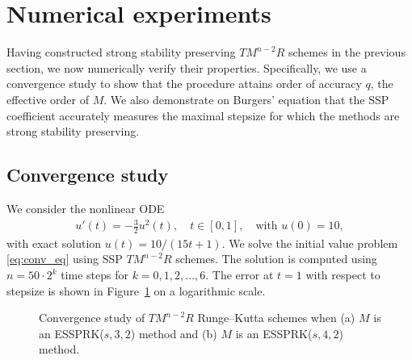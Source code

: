 \section{Numerical experiments}\label{sec:numerics}
Having constructed strong stability preserving $TM^{n-2}R$ schemes in the previous
section, we now numerically verify their properties.
Specifically, we use a convergence study to show that the procedure
attains order of accuracy $q$, the effective order of $M$.
We also demonstrate on Burgers' equation that the
SSP coefficient accurately measures the maximal stepsize for which the
methods are strong stability preserving.

\subsection{Convergence study}\label{subsec:convergence}
We consider the nonlinear ODE
\begin{align}\label{eq:conv_eq}
    u'(t) = -\frac{3}{2}u^{2}(t), \quad t \in [0,1], \quad \text{with } u(0) = 10,
\end{align}
with exact solution $u(t) = 10/(15t + 1)$.
We solve the initial value problem \eqref{eq:conv_eq}
using SSP $TM^{n-2}R$ schemes.
The solution is computed using $n = 50 \cdot 2^{k}$ time steps for
$k = 0, 1, 2, \dots, 6$.
The error at $t=1$ with
respect to stepsize is shown in Figure~\ref{fig:conv_study} on a logarithmic
scale.
\begin{figure}
	\centering
   \quad
    \caption{Convergence study of $TM^{n-2}R$ Runge--Kutta schemes when (a) $M$
    is an ESSPRK($s,3,2$) method and (b) $ M $ is an ESSPRK($s,4,2$) method.}
    \label{fig:conv_study}
\end{figure}
